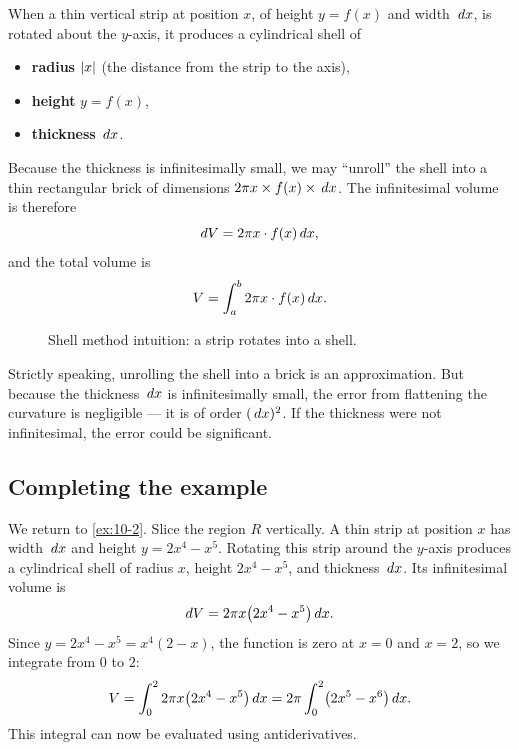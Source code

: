 \begin{definition}
\label{def:10-2}
When a thin vertical strip at position $x$, of height $y = f(x)$ and width $\,dx$, is rotated about the $y$-axis, it produces a cylindrical shell of
\begin{itemize}
  \item \textbf{radius} $\left\lvert x \right\rvert$ (the distance from the strip to the axis),
  \item \textbf{height} $y = f(x)$,
  \item \textbf{thickness} $\,dx$.
\end{itemize}
Because the thickness is infinitesimally small, we may ``unroll'' the shell into a thin rectangular brick of dimensions $2\pi x \times f(x) \times \,dx$.  The infinitesimal volume is therefore
\[
  dV = 2\pi x\cdot f(x)\,dx,
\]
and the total volume is
\[
  V = \int_{a}^{b} 2\pi x\cdot f(x)\,dx.
\]
\end{definition}

\begin{figure}[ht]
  \centering
  
  \caption{Shell method intuition: a strip rotates into a shell.}
  \label{fig:cylindrical-shells}
\end{figure}

\begin{remark}
Strictly speaking, unrolling the shell into a brick is an approximation.  But because the thickness $\,dx$ is infinitesimally small, the error from flattening the curvature is negligible --- it is of order $(\,dx)^{2}$.  If the thickness were not infinitesimal, the error could be significant.
\end{remark}

\subsection*{Completing the example}

We return to \cref{ex:10-2}.  Slice the region $R$ vertically.  A thin strip at position $x$ has width $\,dx$ and height $y = 2x^{4} - x^{5}$.  Rotating this strip around the $y$-axis produces a cylindrical shell of radius $x$, height $2x^{4} - x^{5}$, and thickness $\,dx$.  Its infinitesimal volume is
\[
  dV = 2\pi x\bigl(2x^{4} - x^{5}\bigr)\,dx.
\]
Since $y = 2x^{4} - x^{5} = x^{4}(2 - x)$, the function is zero at $x = 0$ and $x = 2$, so we integrate from $0$ to $2$:
\[
  V = \int_{0}^{2} 2\pi x\bigl(2x^{4} - x^{5}\bigr)\,dx = 2\pi\int_{0}^{2}\bigl(2x^{5} - x^{6}\bigr)\,dx.
\]
This integral can now be evaluated using antiderivatives.

